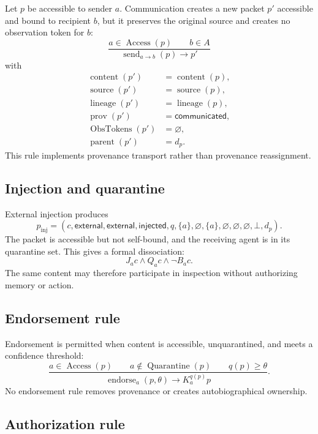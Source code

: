 Let \(p\) be accessible to sender \(a\).  Communication creates a new packet
\(p'\) accessible and bound to recipient \(b\), but it preserves the original
source and creates no observation token for \(b\):
\[
\frac{
  a\in\operatorname{Access}(p)
  \qquad
  b\in A
}{
  \operatorname{send}_{a\to b}(p)
  \longrightarrow
  p'
}
\]
with
\[
\begin{aligned}
\operatorname{content}(p')&=\operatorname{content}(p),\\
\operatorname{source}(p')&=\operatorname{source}(p),\\
\operatorname{lineage}(p')&=\operatorname{lineage}(p),\\
\operatorname{prov}(p')&=\mathsf{communicated},\\
\operatorname{ObsTokens}(p')&=\varnothing,\\
\operatorname{parent}(p')&=d_p.
\end{aligned}
\]
This rule implements provenance transport rather than provenance reassignment.

\subsection{Injection and quarantine}

External injection produces
\[
p_{\mathrm{inj}}
=(c,\mathsf{external},\mathsf{external},\mathsf{injected},q,
\{a\},\varnothing,\{a\},\varnothing,\varnothing,\varnothing,\bot,d_p).
\]
The packet is accessible but not self-bound, and the receiving agent is in its
quarantine set.  This gives a formal dissociation:
\[
J_ac
\wedge
Q_ac
\wedge
\neg B_ac.
\]
The same content may therefore participate in inspection without authorizing
memory or action.

\subsection{Endorsement rule}

Endorsement is permitted when content is accessible, unquarantined, and meets a
confidence threshold:
\[
\frac{
  a\in\operatorname{Access}(p)
  \qquad
  a\notin\operatorname{Quarantine}(p)
  \qquad
  q(p)\ge\theta
}{
  \operatorname{endorse}_a(p,\theta)
  \longrightarrow
  K_a^{q(p)}p
}.
\]
No endorsement rule removes provenance or creates autobiographical ownership.

\subsection{Authorization rule}

